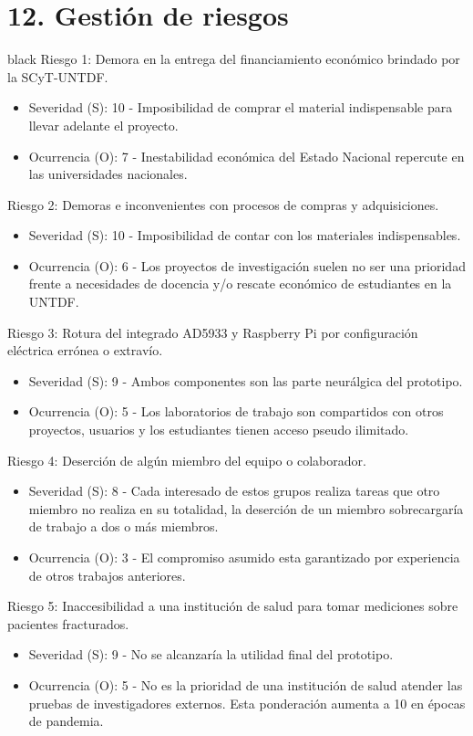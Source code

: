 \documentclass[11pt]{charter}
\begin{document}
\pagebreak
\section{12. Gestión de riesgos}
\label{sec:riesgos}

\begin{consigna}{black}
Riesgo 1: Demora en la entrega del financiamiento económico brindado por la SCyT-UNTDF.
\begin{itemize}
\item Severidad (S): 10 - Imposibilidad de comprar el material indispensable para llevar adelante el proyecto.
\item Ocurrencia (O): 7 - Inestabilidad económica del Estado Nacional repercute en las universidades nacionales.
\end{itemize}

Riesgo 2: Demoras e inconvenientes con procesos de compras y adquisiciones.
\begin{itemize}
\item Severidad (S): 10 - Imposibilidad de contar con los materiales indispensables.
\item Ocurrencia (O): 6 - Los proyectos de investigación suelen no ser una prioridad frente a necesidades de docencia y/o rescate económico de estudiantes en la UNTDF.
\end{itemize}

Riesgo 3: Rotura del integrado AD5933  y Raspberry Pi por configuración eléctrica errónea o extravío.
\begin{itemize}
\item Severidad (S): 9 - Ambos componentes son las parte neurálgica del prototipo.
\item Ocurrencia (O): 5 - Los laboratorios de trabajo son compartidos con otros proyectos, usuarios y los estudiantes tienen acceso pseudo ilimitado.
\end{itemize}

Riesgo 4: Deserción de algún miembro del equipo o colaborador.
\begin{itemize}
\item Severidad (S): 8 - Cada interesado de estos grupos realiza tareas que otro miembro no realiza en su totalidad, la deserción de un miembro sobrecargaría de trabajo a dos o más miembros.
\item Ocurrencia (O): 3 - El compromiso asumido esta garantizado por experiencia de otros trabajos anteriores.
\end{itemize}

Riesgo 5: Inaccesibilidad a una institución de salud para tomar mediciones sobre pacientes fracturados.
\begin{itemize}
\item Severidad (S): 9 - No se alcanzaría la utilidad final del prototipo.
\item Ocurrencia (O): 5 - No es la prioridad de una institución de salud atender las pruebas de investigadores externos. Esta ponderación aumenta a 10 en épocas de pandemia. 
\end{itemize}



\end{consigna}
\end{document}
